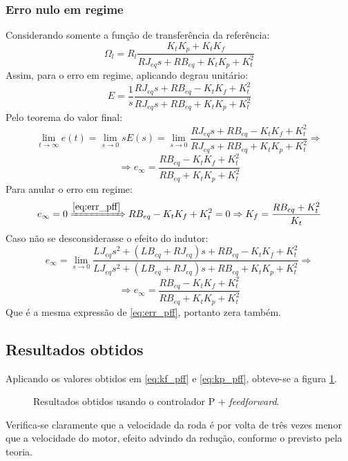 \documentclass{article}[twocolumn]
\begin{document}
	\subsubsection{Erro nulo em regime}
	Considerando somente a fun\c{c}\~ao de transfer\^encia da refer\^encia:
	\begin{equation}
		\Omega_l = R_l\frac{K_tK_p + K_tK_f}{RJ_{eq}s + RB_{eq} + K_tK_p + K_t^2}
		\nonumber
	\end{equation}
	Assim, para o erro em regime, aplicando degrau unit\'ario:
	\begin{equation}
		E =
		\frac{1}{s}\frac{RJ_{eq}s + RB_{eq} - K_tK_f + K_t^2}{RJ_{eq}s + RB_{eq} + K_tK_p + K_t^2}
		\nonumber
	\end{equation}
	Pelo teorema do valor final:
	\begin{equation}
		\lim_{t \rightarrow \infty}e(t) = \lim_{s \rightarrow 0}sE(s) = \lim_{s \rightarrow 0}
		\frac{RJ_{eq}s + RB_{eq} - K_tK_f + K_t^2}{RJ_{eq}s + RB_{eq} + K_tK_p + K_t^2}
		\Rightarrow
		\nonumber
	\end{equation}
	\begin{equation}
		\Rightarrow
		e_\infty = \frac{RB_{eq} - K_tK_f + K_t^2}{RB_{eq} + K_tK_p + K_t^2}
		\label{eq:err_pff}
	\end{equation}
	Para anular o erro em regime:
	\begin{equation}
		e_\infty = 0 \xRightarrow{\ref{eq:err_pff}} RB_{eq} - K_tK_f + K_t^2 = 0
		\Rightarrow K_f = \frac{RB_{eq} + K_t^2}{K_t}
		\label{eq:kf_pff}
	\end{equation}
	Caso n\~ao se desconsiderasse o efeito do indutor:
	\begin{equation}
		e_\infty = \lim_{s \rightarrow 0}
		\frac{LJ_{eq}s^2 + (LB_{eq} + RJ_{eq})s + RB_{eq} - K_tK_f + K_t^2}
		{LJ_{eq}s^2 + (LB_{eq} + RJ_{eq})s + RB_{eq} + K_tK_p + K_t^2} \Rightarrow
		\nonumber
	\end{equation}
	\begin{equation}
		\Rightarrow e_\infty = \frac{RB_{eq} - K_tK_f + K_t^2}{RB_{eq} + K_tK_p + K_t^2}
		\nonumber
	\end{equation}
	Que \'e a mesma express\~ao de \ref{eq:err_pff}, portanto zera tamb\'em.
	\subsection{Resultados obtidos}
	Aplicando os valores obtidos em \ref{eq:kf_pff} e \ref{eq:kp_pff}, obteve-se a figura
	\ref{fig:res_pff}.
	\begin{figure}[H]
		\centering
		\caption{Resultados obtidos usando o controlador P + \textit{feedforward}.}
		\label{fig:res_pff}
	\end{figure}
	Verifica-se claramente que a velocidade da roda \'e por volta de tr\^es vezes menor
	que a velocidade do motor, efeito advindo da redu\c{c}\~ao, conforme o previsto pela
	teoria.
\end{document}
